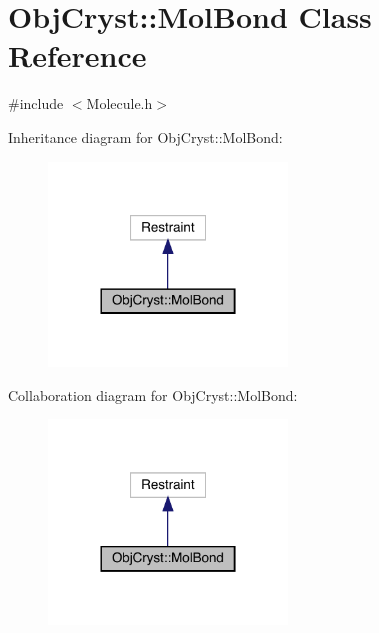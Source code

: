 \hypertarget{class_obj_cryst_1_1_mol_bond}{}\section{Obj\+Cryst\+::Mol\+Bond Class Reference}
\label{class_obj_cryst_1_1_mol_bond}


{\ttfamily \#include $<$Molecule.\+h$>$}



Inheritance diagram for Obj\+Cryst\+::Mol\+Bond\+:
\nopagebreak
\begin{figure}[H]
\begin{center}
\leavevmode
\includegraphics[width=180pt]{class_obj_cryst_1_1_mol_bond__inherit__graph}
\end{center}
\end{figure}


Collaboration diagram for Obj\+Cryst\+::Mol\+Bond\+:
\nopagebreak
\begin{figure}[H]
\begin{center}
\leavevmode
\includegraphics[width=180pt]{class_obj_cryst_1_1_mol_bond__coll__graph}
\end{center}
\end{figure}
